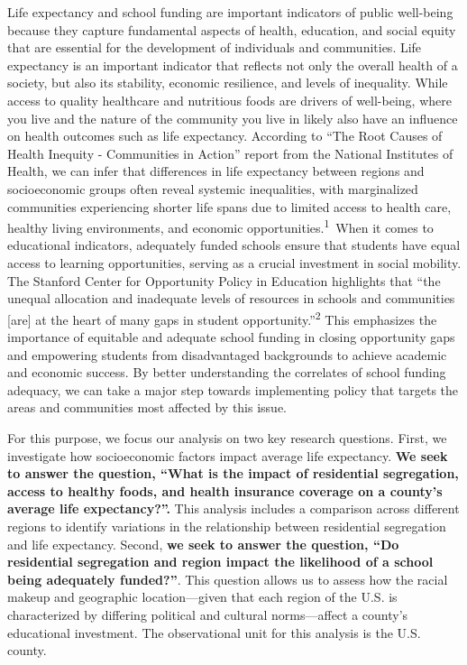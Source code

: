 \documentclass[
  10pt,
  letterpaper,
  DIV=11,
  numbers=noendperiod]{scrartcl}
\begin{document}
Life expectancy and school funding are important indicators of public
well-being because they capture fundamental aspects of health,
education, and social equity that are essential for the development of
individuals and communities. Life expectancy is an important indicator
that reflects not only the overall health of a society, but also its
stability, economic resilience, and levels of inequality. While access
to quality healthcare and nutritious foods are drivers of well-being,
where you live and the nature of the community you live in likely also
have an influence on health outcomes such as life expectancy. According
to ``The Root Causes of Health Inequity - Communities in Action'' report
from the National Institutes of Health, we can infer that differences in
life expectancy between regions and socioeconomic groups often reveal
systemic inequalities, with marginalized communities experiencing
shorter life spans due to limited access to health care, healthy living
environments, and economic opportunities.\textsuperscript{1}~When it
comes to educational indicators, adequately funded schools ensure that
students have equal access to learning opportunities, serving as a
crucial investment in social mobility. The Stanford Center for
Opportunity Policy in Education highlights that ``the unequal allocation
and inadequate levels of resources in schools and communities {[}are{]}
at the heart of many gaps in student opportunity.''\textsuperscript{2}
This emphasizes the importance of equitable and adequate school funding
in closing opportunity gaps and empowering students from disadvantaged
backgrounds to achieve academic and economic success. By better
understanding the correlates of school funding adequacy, we can take a
major step towards implementing policy that targets the areas and
communities most affected by this issue.

For this purpose, we focus our analysis on two key research questions.
First, we investigate how socioeconomic factors impact average life
expectancy. \textbf{We seek to answer the question, ``What is the impact
of residential segregation, access to healthy foods, and health
insurance coverage on a county's average life expectancy?''.} This
analysis includes a comparison across different regions to identify
variations in the relationship between residential segregation and life
expectancy. Second, \textbf{we seek to answer the question, ``Do
residential segregation and region impact the likelihood of a school
being adequately funded?''}. This question allows us to assess how the
racial makeup and geographic location---given that each region of the
U.S. is characterized by differing political and cultural norms---affect
a county's educational investment. The observational unit for this
analysis is the U.S. county.
\end{document}
